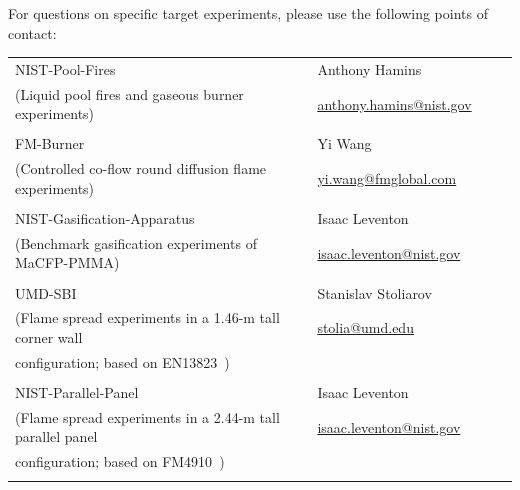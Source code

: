 \documentclass[12pt]{article}
\begin{document}
\noindent For questions on specific target experiments, please use the following points of contact:
\begin{table}[htb]
\begin{tabular}{|p{0.6\linewidth} | p{0.4\linewidth}|}
\hline
NIST-Pool-Fires           & Anthony Hamins\\
(Liquid pool fires and gaseous burner experiments)& \href{mailto:anthony.hamins@nist.gov}{anthony.hamins@nist.gov}\\
&\\
\hline
FM-Burner & Yi Wang\\
(Controlled co-flow round diffusion flame experiments)& \href{mailto:yi.wang@fmglobal.com}{yi.wang@fmglobal.com}\\
&\\
\hline
NIST-Gasification-Apparatus & Isaac Leventon \\
(Benchmark gasification experiments of MaCFP-PMMA)&\href{mailto:isaac.leventon@nist.gov}{isaac.leventon@nist.gov}\\
&\\
\hline
UMD-SBI & Stanislav Stoliarov \\
(Flame spread experiments in a 1.46-m tall corner wall &\href{mailto:stolia@umd.edu}{stolia@umd.edu}\\
configuration; based on EN13823~\cite{EN-13823standard})&\\
&\\
\hline
NIST-Parallel-Panel &Isaac Leventon \\
(Flame spread experiments in a 2.44-m tall parallel panel&\href{mailto:isaac.leventon@nist.gov}{isaac.leventon@nist.gov}\\
configuration; based on FM4910~\cite{FM-4910standard})& \\
& \\
\hline

\end{tabular}
\end{table}

\clearpage

\end{document}
